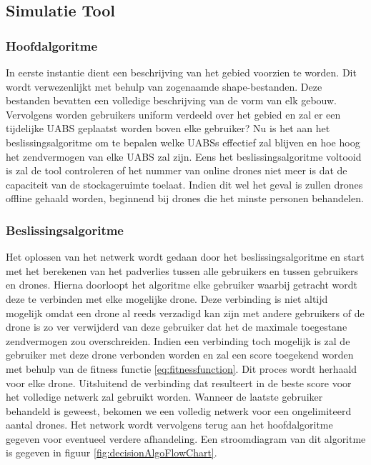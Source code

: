 \documentclass[twocolumn]{phdsymp} %
\begin{document}
\subsection{Simulatie Tool}

\subsubsection{Hoofdalgoritme}
In eerste instantie dient een beschrijving van het gebied voorzien te worden. Dit wordt verwezenlijkt met behulp van 
zogenaamde shape-bestanden. Deze bestanden bevatten een volledige beschrijving van de vorm van elk gebouw. Vervolgens 
worden gebruikers uniform verdeeld over het gebied en zal er een tijdelijke \gls{UABS} geplaatst worden boven elke gebruiker?
Nu is het aan het beslissingsalgoritme om te bepalen welke \gls{UABS}s effectief zal blijven en hoe hoog het zendvermogen van elke \gls{UABS}
zal zijn. Eens het beslissingsalgoritme voltooid is zal de tool controleren of het nummer van online drones niet meer is dat 
de capaciteit van de stockageruimte toelaat. Indien dit wel het geval is zullen drones offline gehaald worden, beginnend bij 
drones die het minste personen behandelen.

\subsubsection{Beslissingsalgoritme}

Het oplossen van het netwerk wordt gedaan door het beslissingsalgoritme en start met het berekenen van het padverlies tussen 
alle gebruikers en tussen gebruikers en drones. Hierna doorloopt het algoritme elke gebruiker waarbij getracht wordt deze te verbinden 
met elke mogelijke drone. Deze verbinding is niet altijd mogelijk omdat een drone al reeds verzadigd kan zijn met andere gebruikers of 
de drone is zo ver verwijderd van deze gebruiker dat het de maximale toegestane zendvermogen zou overschreiden.
Indien een verbinding toch mogelijk is zal de gebruiker met deze drone verbonden worden en zal een score toegekend worden met behulp van 
de fitness functie  \ref{eq:fitnessfunction}. 
Dit proces wordt herhaald voor elke drone. Uitsluitend de verbinding dat resulteert in de beste score voor het volledige netwerk 
zal gebruikt worden. Wanneer de laatste gebruiker behandeld is geweest, bekomen we een volledig netwerk voor een ongelimiteerd aantal drones.
Het network wordt vervolgens terug aan het hoofdalgoritme gegeven voor eventueel verdere afhandeling.
Een stroomdiagram van dit algoritme is gegeven in figuur \ref{fig:decisionAlgoFlowChart}.
\end{document}
